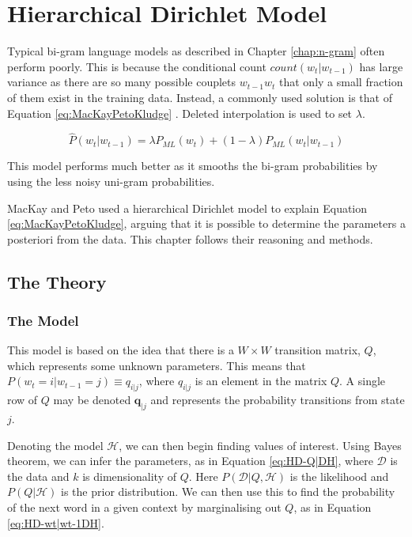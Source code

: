 \chapter{Hierarchical Dirichlet Model} \label{chap:HierarchicalDirichletModel}

Typical bi-gram language models as described in Chapter \ref{chap:n-gram} often perform poorly. This is because the conditional count $count(w_{t}|w_{t-1})$ has large variance as there are so many possible couplets $w_{t-1}w_{t}$ that only a small fraction of them exist in the training data. Instead, a commonly used solution is that of Equation \ref{eq:MacKayPetoKludge} \cite{mackay1995hierarchical}. Deleted interpolation \cite{jelinek1980interpolated} is used to set $\lambda$. 


\begin{equation}
\hat{P}(w_{t}|w_{t-1})=\lambda P_{ML}(w_{t})+(1-\lambda)P_{ML}(w_{t}|w_{t-1})
\label{eq:MacKayPetoKludge}
\end{equation}

\noindent This model performs much better as it smooths the bi-gram probabilities by using the less noisy uni-gram probabilities.



MacKay and Peto \cite{mackay1995hierarchical} used a hierarchical Dirichlet model to explain Equation \ref{eq:MacKayPetoKludge}, arguing that it is possible to determine the parameters a posteriori from the data. This chapter follows their reasoning and methods.

\section{The Theory}

\subsection{The Model}

This model is based on the idea that there is a $W\times W$ transition matrix, $Q$, which represents some unknown parameters. This means that $P(w_{t}=i|w_{t-1}=j)\equiv q_{i|j}$, where $q_{i|j}$ is an element in the matrix $Q$. A single row of $Q$ may be denoted $\boldsymbol{q}_{|j}$ and represents the probability transitions from state $j$.

Denoting the model $\mathscr{H}$, we can then begin finding values of interest. Using Bayes theorem, we can infer the parameters, as in Equation \ref{eq:HD-Q|DH}, where $\mathcal{D}$ is the data and $k$ is dimensionality of $Q$. Here $P(\mathcal{D}|Q,\mathscr{H})$ is the likelihood and $P(Q|\mathscr{H})$ is the prior distribution. We can then use this to find the probability of the next word in a given context by marginalising out $Q$, as in Equation \ref{eq:HD-wt|wt-1DH}.


